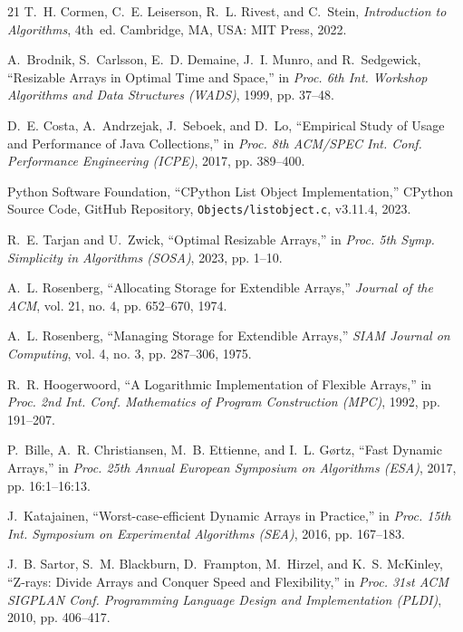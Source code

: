 \documentclass[conference]{IEEEtran}
\begin{document}
\begin{thebibliography}{21}
T.~H. Cormen, C.~E. Leiserson, R.~L. Rivest, and C.~Stein, \emph{Introduction to Algorithms}, 4th~ed. Cambridge, MA, USA: MIT Press, 2022.

A.~Brodnik, S.~Carlsson, E.~D. Demaine, J.~I. Munro, and R.~Sedgewick, ``Resizable Arrays in Optimal Time and Space,'' in \emph{Proc. 6th Int. Workshop Algorithms and Data Structures (WADS)}, 1999, pp. 37--48.

D.~E. Costa, A.~Andrzejak, J.~Seboek, and D.~Lo, ``Empirical Study of Usage and Performance of Java Collections,'' in \emph{Proc. 8th ACM/SPEC Int. Conf. Performance Engineering (ICPE)}, 2017, pp. 389--400.

Python Software Foundation, ``CPython List Object Implementation,'' CPython Source Code, GitHub Repository, \texttt{Objects/listobject.c}, v3.11.4, 2023.

R.~E. Tarjan and U.~Zwick, ``Optimal Resizable Arrays,'' in \emph{Proc. 5th Symp. Simplicity in Algorithms (SOSA)}, 2023, pp. 1--10.

A.~L. Rosenberg, ``Allocating Storage for Extendible Arrays,'' \emph{Journal of the ACM}, vol. 21, no. 4, pp. 652--670, 1974.

A.~L. Rosenberg, ``Managing Storage for Extendible Arrays,'' \emph{SIAM Journal on Computing}, vol. 4, no. 3, pp. 287--306, 1975.

R.~R. Hoogerwoord, ``A Logarithmic Implementation of Flexible Arrays,'' in \emph{Proc. 2nd Int. Conf. Mathematics of Program Construction (MPC)}, 1992, pp. 191--207.

P.~Bille, A.~R. Christiansen, M.~B. Ettienne, and I.~L. G{\o}rtz, ``Fast Dynamic Arrays,'' in \emph{Proc. 25th Annual European Symposium on Algorithms (ESA)}, 2017, pp. 16:1--16:13.

J.~Katajainen, ``Worst-case-efficient Dynamic Arrays in Practice,'' in \emph{Proc. 15th Int. Symposium on Experimental Algorithms (SEA)}, 2016, pp. 167--183.

J.~B. Sartor, S.~M. Blackburn, D.~Frampton, M.~Hirzel, and K.~S. McKinley, ``Z-rays: Divide Arrays and Conquer Speed and Flexibility,'' in \emph{Proc. 31st ACM SIGPLAN Conf. Programming Language Design and Implementation (PLDI)}, 2010, pp. 406--417.


\end{thebibliography}
\end{document}
